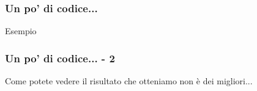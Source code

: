 \begin{frame}[fragile]
  \frametitle{Un po' di codice...}
  
  \begin{exampleblock}{Esempio}
    
  \end{exampleblock}
\end{frame}

\begin{frame}
 
 \frametitle{Un po' di codice... - 2}
 
 \huge Come potete vedere il risultato che otteniamo non è dei migliori...
\end{frame}
